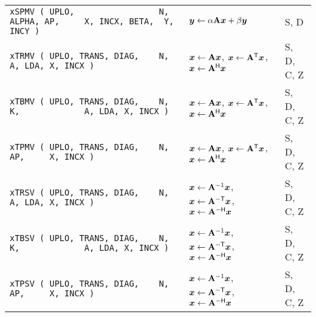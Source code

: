 \documentclass[10pt,a3paper, landscape]{article}
\newcommand{\T}{\mathsf{T}}
\renewcommand{\H}{\mathsf{H}}
\begin{document}
\begin{tabular}{ll>{\ttfamily}l}
		\verb|xSPMV ( UPLO,                 N,         ALPHA, AP,     X, INCX, BETA,  Y, INCY )        | & $\vb*{y} \gets \alpha \vb{A} \vb*{x} + \beta \vb*{y}$                                                                                                                                                                                                        & S, D               \\
		\verb|xTRMV ( UPLO, TRANS, DIAG,    N,                A, LDA, X, INCX )                        | & $\vb*{x} \gets \vb{A} \vb*{x}$, $\vb*{x} \gets \vb{A}^{\T} \vb*{x}$, $\vb*{x} \gets \vb{A}^{\H} \vb*{x}$                                                                                                                                                     & S, D, C, Z         \\
		\verb|xTBMV ( UPLO, TRANS, DIAG,    N, K,             A, LDA, X, INCX )                        | & $\vb*{x} \gets \vb{A} \vb*{x}$, $\vb*{x} \gets \vb{A}^{\T} \vb*{x}$, $\vb*{x} \gets \vb{A}^{\H} \vb*{x}$                                                                                                                                                     & S, D, C, Z         \\
		\verb|xTPMV ( UPLO, TRANS, DIAG,    N,                AP,     X, INCX )                        | & $\vb*{x} \gets \vb{A} \vb*{x}$, $\vb*{x} \gets \vb{A}^{\T} \vb*{x}$, $\vb*{x} \gets \vb{A}^{\H} \vb*{x}$                                                                                                                                                     & S, D, C, Z         \\
		\verb|xTRSV ( UPLO, TRANS, DIAG,    N,                A, LDA, X, INCX )                        | & $\vb*{x} \gets \vb{A}^{-1} \vb*{x}$, $\vb*{x} \gets \vb{A}^{-\T} \vb*{x}$, $\vb*{x} \gets \vb{A}^{-\H} \vb*{x}$                                                                                                                                              & S, D, C, Z         \\
		\verb|xTBSV ( UPLO, TRANS, DIAG,    N, K,             A, LDA, X, INCX )                        | & $\vb*{x} \gets \vb{A}^{-1} \vb*{x}$, $\vb*{x} \gets \vb{A}^{-\T} \vb*{x}$, $\vb*{x} \gets \vb{A}^{-\H} \vb*{x}$                                                                                                                                              & S, D, C, Z         \\
		\verb|xTPSV ( UPLO, TRANS, DIAG,    N,                AP,     X, INCX )                        | & $\vb*{x} \gets \vb{A}^{-1} \vb*{x}$, $\vb*{x} \gets \vb{A}^{-\T} \vb*{x}$, $\vb*{x} \gets \vb{A}^{-\H} \vb*{x}$                                                                                                                                              & S, D, C, Z         \\

\end{tabular}
\end{document}
